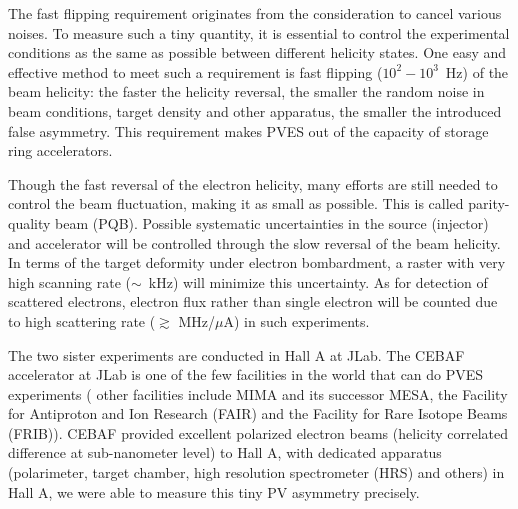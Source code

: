 The fast flipping requirement originates from the consideration to cancel various 
noises. To measure such a tiny quantity, it is essential to control
the experimental conditions as the same as possible between different
helicity states. One easy and effective method to meet such a requirement is fast 
flipping ($10^2 - 10^3$~Hz) of the beam helicity: the faster the helicity reversal, the smaller
the random noise in beam conditions, target density and other apparatus, the smaller
the introduced false asymmetry. This requirement makes PVES out of the capacity
of storage ring accelerators.

Though the fast reversal of the electron helicity, many efforts are still needed to
control the beam fluctuation, making it as small as possible. This is called
parity-quality beam (PQB). Possible systematic uncertainties in the source (injector) 
and accelerator will be controlled through the slow reversal of the beam helicity. 
In terms of the target deformity under electron bombardment,
a raster with very high scanning rate ($\sim$~kHz) will minimize this uncertainty. 
As for detection of scattered electrons, electron flux rather than single electron will
be counted due to high scattering rate ($\gtrsim$ MHz/$\mu$A) in such experiments.

The two sister experiments are conducted in Hall A at JLab. The CEBAF accelerator 
at JLab is one of the few facilities in the world that can do PVES experiments (
other facilities include MIMA and its successor MESA, the Facility for Antiproton
and Ion Research (FAIR) and the Facility for Rare Isotope Beams (FRIB)). CEBAF 
provided excellent polarized electron beams (helicity correlated difference at 
sub-nanometer level) to Hall A, with dedicated apparatus 
(polarimeter, target chamber, high resolution spectrometer (HRS) and others) in Hall A, 
we were able to measure this tiny PV asymmetry precisely.

